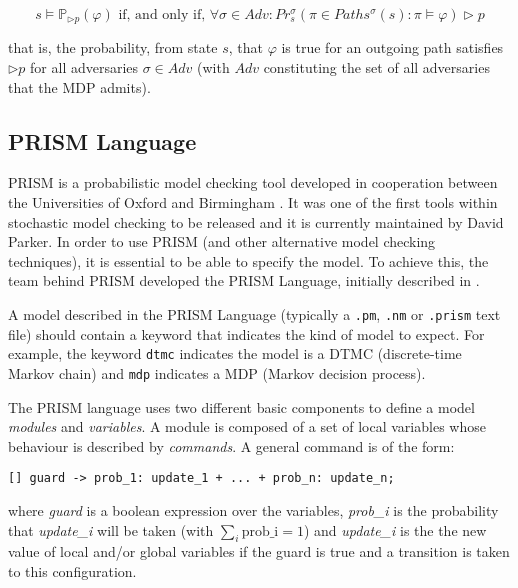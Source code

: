 \begin{equation}
	s \models \mathbb{P}_{\triangleright p} (\varphi) \text{ if, and only if, } \forall \sigma \in Adv: Pr^{\sigma}_s (\pi \in Paths^{\sigma}(s): \pi \models \varphi) \triangleright p
\end{equation}

that is, the probability, from state $s$, that $\varphi$ is true for an outgoing path satisfies $\triangleright p$ for all adversaries $\sigma \in Adv$ (with $Adv$ constituting the set of all adversaries that the MDP admits).

\subsection{PRISM Language}

PRISM is a probabilistic model checking tool developed in cooperation between the Universities of Oxford and Birmingham \cite{prism}. It was one of the first tools within stochastic model checking to be released and it is currently maintained by David Parker. In order to use PRISM (and other alternative model checking techniques), it is essential to be able to specify the model. To achieve this, the team behind PRISM developed the PRISM Language, initially described in \cite{prism_1}.

A model described in the PRISM Language (typically a \texttt{.pm}, \texttt{.nm} or \texttt{.prism} text file) should contain a keyword that indicates the kind of model to expect. For example, the keyword \texttt{dtmc} indicates the model is a DTMC (discrete-time Markov chain) and \texttt{mdp} indicates a MDP (Markov decision process).

The PRISM language uses two different basic components to define a model \textit{modules} and \textit{variables}. A module is composed of a set of local variables whose behaviour is described by \textit{commands}. A general command is of the form:

{\vspace{1em}
\begin{lstlisting}
[] guard -> prob_1: update_1 + ... + prob_n: update_n;
\end{lstlisting}
}

where \textit{guard} is a boolean expression over the variables, \textit{prob\_i} is the probability that \textit{update\_i} will be taken (with $\sum_i \text{prob\_i} = 1$) and \textit{update\_i} is the the new value of local and/or global variables if the guard is true and a transition is taken to this configuration.

